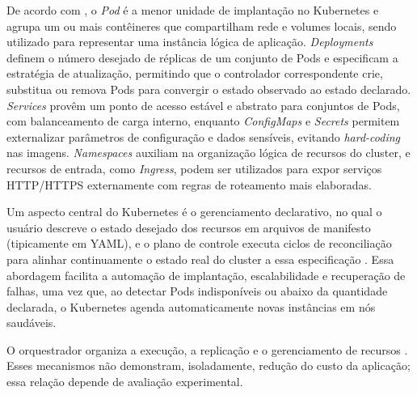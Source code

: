 De acordo com \citet{kubernetes2026documentation,burns2019}, o \textit{Pod} é a menor unidade de implantação no Kubernetes e agrupa um ou mais contêineres que compartilham rede e volumes locais, sendo utilizado para representar uma instância lógica de aplicação. \textit{Deployments} definem o número desejado de réplicas de um conjunto de Pods e especificam a estratégia de atualização, permitindo que o controlador correspondente crie, substitua ou remova Pods para convergir o estado observado ao estado declarado. \textit{Services} provêm um ponto de acesso estável e abstrato para conjuntos de Pods, com balanceamento de carga interno, enquanto \textit{ConfigMaps} e \textit{Secrets} permitem externalizar parâmetros de configuração e dados sensíveis, evitando \textit{hard-coding} nas imagens. \textit{Namespaces} auxiliam na organização lógica de recursos do cluster, e recursos de entrada, como \textit{Ingress}, podem ser utilizados para expor serviços HTTP/HTTPS externamente com regras de roteamento mais elaboradas.

Um aspecto central do Kubernetes é o gerenciamento declarativo, no qual o usuário descreve o estado desejado dos recursos em arquivos de manifesto (tipicamente em YAML), e o plano de controle executa ciclos de reconciliação para alinhar continuamente o estado real do cluster a essa especificação \cite{kubernetes2026documentation,burns2019}. Essa abordagem facilita a automação de implantação, escalabilidade e recuperação de falhas, uma vez que, ao detectar Pods indisponíveis ou abaixo da quantidade declarada, o Kubernetes agenda automaticamente novas instâncias em nós saudáveis.

O orquestrador organiza a execução, a replicação e o gerenciamento de recursos \cite{kubernetes2026documentation,burns2019}. Esses mecanismos não demonstram, isoladamente, redução do custo da aplicação; essa relação depende de avaliação experimental. 




